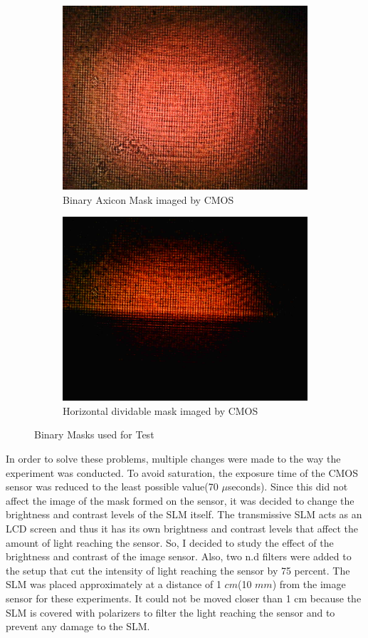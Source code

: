    \begin{figure}[h]
    \centering
    \begin{subfigure}{0.5\textwidth}
    \centering
        \includegraphics[width=0.5\linewidth]{pics/slm/binaryaxiconcmos.jpg}
        \caption{Binary Axicon Mask imaged by CMOS}
        \label{fig:binaryaxiconcmos}
    \end{subfigure}%
    \begin{subfigure}{0.5\textwidth}
    \centering
        \includegraphics[width=0.5\linewidth]{pics/slm/horizontalcmos.jpg}
        \caption{Horizontal dividable mask imaged by CMOS}
        \label{fig:hordivmask}
    \end{subfigure}
    \caption{Binary Masks used for Test}
    \label{fig:InitMaskCMOS}
    \end{figure}
In order to solve these problems, multiple changes were made to the way the experiment was conducted. To avoid saturation, the exposure time of the CMOS sensor was reduced to the least possible value(70 $\mu$seconds). Since this did not affect the image of the mask formed on the sensor, it was decided to change the brightness and contrast levels of the SLM itself. The transmissive SLM acts as an LCD screen and thus it has its own brightness and contrast levels that affect the amount of light reaching the sensor. So, I decided to study the effect of the brightness and contrast of the image sensor. Also, two n.d filters were added to the setup that cut the intensity of light reaching the sensor by 75 percent. The SLM was placed approximately at a distance of 1 $cm$(10 $mm$) from the image sensor for these experiments. It could not be moved closer than 1 cm because the SLM is covered with polarizers to filter the light reaching the sensor and to prevent any damage to the SLM.

